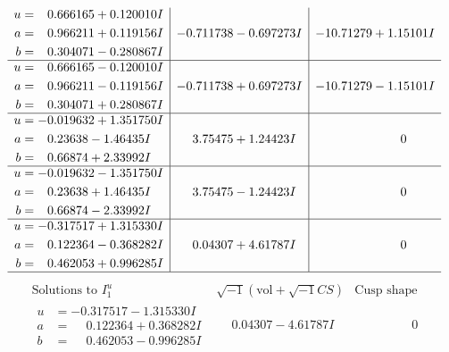 \documentclass[1p]{elsarticle_modified}
\theoremstyle{definition}
\newcommand{\I}{\sqrt{-1}}
\begin{document}
$$\begin{array}{c|c|c}
\begin{aligned}
u &= \phantom{-}0.666165 + 0.120010 I \\
a &= \phantom{-}0.966211 + 0.119156 I \\
b &= \phantom{-}0.304071 - 0.280867 I\end{aligned}
 & -0.711738 - 0.697273 I & -10.71279 + 1.15101 I \\ \hline\begin{aligned}
u &= \phantom{-}0.666165 - 0.120010 I \\
a &= \phantom{-}0.966211 - 0.119156 I \\
b &= \phantom{-}0.304071 + 0.280867 I\end{aligned}
 & -0.711738 + 0.697273 I & -10.71279 - 1.15101 I \\ \hline\begin{aligned}
u &= -0.019632 + 1.351750 I \\
a &= \phantom{-}0.23638 - 1.46435 I \\
b &= \phantom{-}0.66874 + 2.33992 I\end{aligned}
 & \phantom{-}3.75475 + 1.24423 I & \phantom{-0.000000 } 0 \\ \hline\begin{aligned}
u &= -0.019632 - 1.351750 I \\
a &= \phantom{-}0.23638 + 1.46435 I \\
b &= \phantom{-}0.66874 - 2.33992 I\end{aligned}
 & \phantom{-}3.75475 - 1.24423 I & \phantom{-0.000000 } 0 \\ \hline\begin{aligned}
u &= -0.317517 + 1.315330 I \\
a &= \phantom{-}0.122364 - 0.368282 I \\
b &= \phantom{-}0.462053 + 0.996285 I\end{aligned}
 & \phantom{-}0.04307 + 4.61787 I & \phantom{-0.000000 } 0\\
 \hline 
 \end{array}$$\newpage$$\begin{array}{c|c|c}  
\text{Solutions to }I^u_{1}& \I (\text{vol} + \sqrt{-1}CS) & \text{Cusp shape}\\
 \hline 
\begin{aligned}
u &= -0.317517 - 1.315330 I \\
a &= \phantom{-}0.122364 + 0.368282 I \\
b &= \phantom{-}0.462053 - 0.996285 I\end{aligned}
 & \phantom{-}0.04307 - 4.61787 I & \phantom{-0.000000 } 0 \\ \hline\begin{aligned}

\end{aligned}
\end{array}$$
\end{document}
